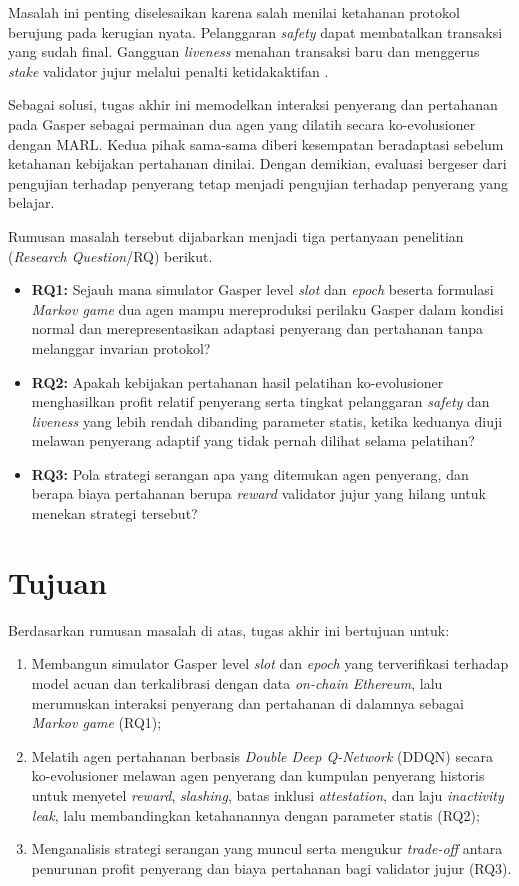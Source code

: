 Masalah ini penting diselesaikan karena salah menilai ketahanan protokol berujung pada kerugian nyata. Pelanggaran \textit{safety} dapat membatalkan transaksi yang sudah final. Gangguan \textit{liveness} menahan transaksi baru dan menggerus \textit{stake} validator jujur melalui penalti ketidakaktifan \parencite{laneve2025stochastic}.

Sebagai solusi, tugas akhir ini memodelkan interaksi penyerang dan pertahanan pada Gasper sebagai permainan dua agen yang dilatih secara ko-evolusioner dengan MARL. Kedua pihak sama-sama diberi kesempatan beradaptasi sebelum ketahanan kebijakan pertahanan dinilai. Dengan demikian, evaluasi bergeser dari pengujian terhadap penyerang tetap menjadi pengujian terhadap penyerang yang belajar.

Rumusan masalah tersebut dijabarkan menjadi tiga pertanyaan penelitian (\textit{Research Question}/RQ) berikut.
\begin{itemize}
    \item \textbf{RQ1:} Sejauh mana simulator Gasper level \textit{slot} dan \textit{epoch} beserta formulasi \textit{Markov game} dua agen mampu mereproduksi perilaku Gasper dalam kondisi normal dan merepresentasikan adaptasi penyerang dan pertahanan tanpa melanggar invarian protokol?
    \item \textbf{RQ2:} Apakah kebijakan pertahanan hasil pelatihan ko-evolusioner menghasilkan profit relatif penyerang serta tingkat pelanggaran \textit{safety} dan \textit{liveness} yang lebih rendah dibanding parameter statis, ketika keduanya diuji melawan penyerang adaptif yang tidak pernah dilihat selama pelatihan?
    \item \textbf{RQ3:} Pola strategi serangan apa yang ditemukan agen penyerang, dan berapa biaya pertahanan berupa \textit{reward} validator jujur yang hilang untuk menekan strategi tersebut?
\end{itemize}

\section{Tujuan}
\label{sec:tujuan}
Berdasarkan rumusan masalah di atas, tugas akhir ini bertujuan untuk:
\begin{enumerate}
	\item Membangun simulator Gasper level \textit{slot} dan \textit{epoch} yang terverifikasi terhadap model acuan dan terkalibrasi dengan data \textit{on-chain Ethereum}, lalu merumuskan interaksi penyerang dan pertahanan di dalamnya sebagai \textit{Markov game} (RQ1);
	\item Melatih agen pertahanan berbasis \textit{Double Deep Q-Network} (DDQN) secara ko-evolusioner melawan agen penyerang dan kumpulan penyerang historis untuk menyetel \textit{reward}, \textit{slashing}, batas inklusi \textit{attestation}, dan laju \textit{inactivity leak}, lalu membandingkan ketahanannya dengan parameter statis (RQ2);
	\item Menganalisis strategi serangan yang muncul serta mengukur \textit{trade-off} antara penurunan profit penyerang dan biaya pertahanan bagi validator jujur (RQ3).
\end{enumerate}

